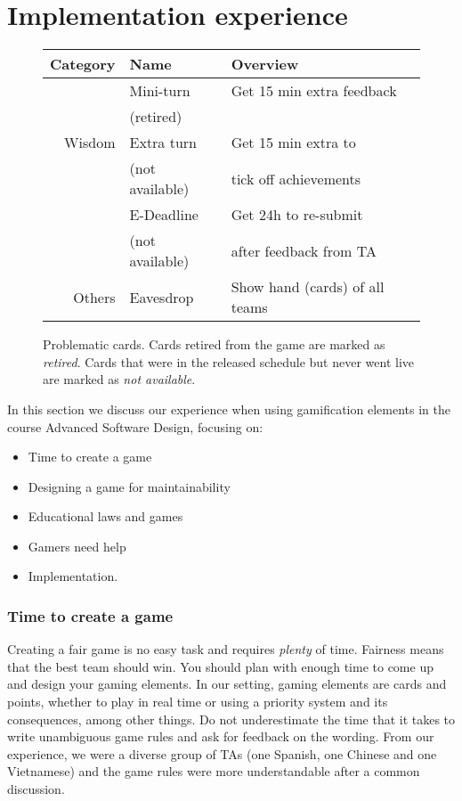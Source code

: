 \documentclass[
]{article}
\begin{document}
\hypertarget{sec:implementation}{%
\section{Implementation experience}\label{sec:implementation}}

\begin{figure}[t]
\begin{tabular}{|r|l|l|}
\hline
Category & Name & Overview \\
\hline
& Mini-turn & Get 15 min extra feedback  \\
& (retired) & \\ \cline{2-3}
Wisdom & Extra turn & Get 15 min extra to \\
& (not available) & tick off achievements \\ \cline{2-3}
& E-Deadline & Get 24h to re-submit  \\
& (not available) & after feedback from TA \\ \cline{2-3}
\hline
Others & Eavesdrop & Show hand (cards) of all teams \\
\hline
\end{tabular}
\caption{\label{fig:ncards}Problematic cards.
Cards retired from the game are marked as \emph{retired}.
Cards that were in the released schedule but
never went live are marked as \emph{not available}.}
\end{figure}

In this section we discuss our experience when using gamification
elements in the course Advanced Software Design, focusing on:

\begin{itemize}
\item Time to create a game
\item Designing a game for maintainability
\item Educational laws and games
\item Gamers need help
\item Implementation.
\end{itemize}

\hypertarget{time-to-create-a-game}{%
\subsubsection*{Time to create a game}\label{time-to-create-a-game}}

Creating a fair game is no easy task and requires \emph{plenty} of time.
Fairness means that the best team should win. You should plan with
enough time to come up and design your gaming elements. In our setting,
gaming elements are cards and points, whether to play in real time or
using a priority system and its consequences, among other things. Do not
underestimate the time that it takes to write unambiguous game rules and
ask for feedback on the wording. From our experience, we were a diverse
group of TAs (one Spanish, one Chinese and one Vietnamese) and the game
rules were more understandable after a common discussion.
\end{document}
